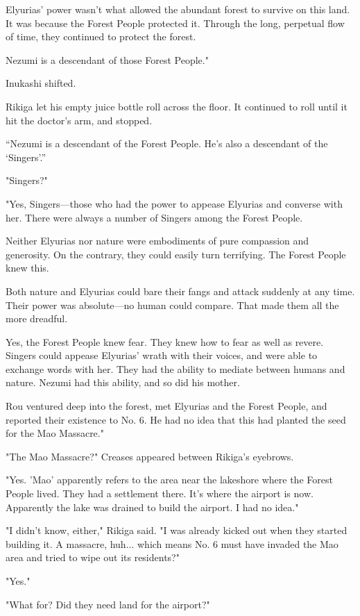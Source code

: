 Elyurias' power wasn't what allowed the abundant forest to survive on
this land. It was because the Forest People protected it. Through the
long, perpetual flow of time, they continued to protect the forest.

Nezumi is a descendant of those Forest People."

Inukashi shifted.

Rikiga let his empty juice bottle roll across the floor. It continued to
roll until it hit the doctor's arm, and stopped.

\enquote{Nezumi is a descendant of the Forest People. He's also a descendant of
the \enquote{Singers}.}

"Singers?"

"Yes, Singers---those who had the power to appease Elyurias and converse
with her. There were always a number of Singers among the Forest
People.

Neither Elyurias nor nature were embodiments of pure compassion and
generosity. On the contrary, they could easily turn terrifying. The
Forest People knew this.

Both nature and Elyurias could bare their fangs and attack suddenly at
any time. Their power was absolute---no human could compare. That made
them all the more dreadful.

Yes, the Forest People knew fear. They knew how to fear as well as
revere. Singers could appease Elyurias' wrath with their voices, and
were able to exchange words with her. They had the ability to mediate
between humans and nature. Nezumi had this ability, and so did his
mother.

Rou ventured deep into the forest, met Elyurias and the Forest People,
and reported their existence to No. 6. He had no idea that this had
planted the seed for the Mao Massacre."

"The Mao Massacre?" Creases appeared between Rikiga's eyebrows.

"Yes. 'Mao' apparently refers to the area near the lakeshore where the
Forest People lived. They had a settlement there. It's where the airport
is now. Apparently the lake was drained to build the airport. I had no
idea."

"I didn't know, either," Rikiga said. "I was already kicked out when
they started building it. A massacre, huh... which means No. 6 must have
invaded the Mao area and tried to wipe out its residents?"

"Yes."

"What for? Did they need land for the airport?"


